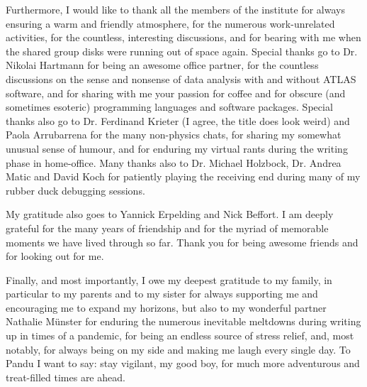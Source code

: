 Furthermore, I would like to thank all the members of the institute for always ensuring a warm and friendly atmosphere, for the numerous work-unrelated activities, for the countless, interesting discussions, and for bearing with me when the shared group disks were running out of space again.
Special thanks go to Dr.\@\xspace Nikolai Hartmann for being an awesome office partner, for the countless discussions on the sense and nonsense of data analysis with and without ATLAS software, and for sharing with me your passion for coffee and for obscure (and sometimes esoteric) programming languages and software packages.
Special thanks also go to Dr.\@\xspace Ferdinand Krieter (I agree, the title does look weird) and Paola Arrubarrena for the many non-physics chats, for sharing my somewhat unusual sense of humour, and for enduring my virtual rants during the writing phase in home-office.
Many thanks also to Dr.\@\xspace Michael Holzbock, Dr.\@\xspace Andrea Matic and David Koch for patiently playing the receiving end during many of my rubber duck debugging sessions. 

My gratitude also goes to Yannick Erpelding and Nick Beffort. I am deeply grateful for the many years of friendship and for the myriad of memorable moments we have lived through so far. Thank you for being awesome friends and for looking out for me.

Finally, and most importantly, I owe my deepest gratitude to my family, in particular to my parents and to my sister for always supporting me and encouraging me to expand my horizons, but also to my wonderful partner Nathalie M\"unster for enduring the numerous inevitable meltdowns during writing up in times of a pandemic, for being an endless source of stress relief, and, most notably, for always being on my side and making me laugh every single day. To Pandu I want to say: stay vigilant, my good boy, for much more adventurous and treat-filled times are ahead.  

%
%
%


\clearpage